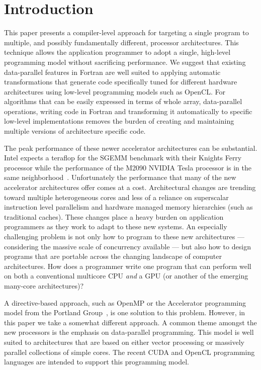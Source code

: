 \section{Introduction}
\label{sec:intro}

This paper presents a compiler-level approach for targeting a single program to
multiple, and possibly fundamentally different, processor architectures.  This
technique allows the application programmer to adopt a single, high-level
programming model without sacrificing performance.  We suggest that existing
data-parallel features in Fortran are well suited to applying automatic
transformations that generate code specifically tuned for different hardware
architectures using low-level programming models such as OpenCL.  For algorithms
that can be easily expressed in terms of whole array, data-parallel operations,
writing code in Fortran and transforming it automatically to specific low-level
implementations removes the burden of creating and maintaining multiple versions
of architecture specific code.

The peak performance of these newer accelerator architectures can be substantial.
Intel expects a teraflop for the SGEMM benchmark with their Knights Ferry
processor while the performance of the M2090 NVIDIA Tesla processor is in the
same neighborhood~\cite{hpcwire11manycore}.  Unfortunately the performance that
many of the new accelerator architectures offer comes at a cost.  Architectural
changes are trending toward multiple heterogeneous cores and less of a reliance
on superscalar instruction level parallelism and hardware managed memory
hierarchies (such as traditional caches).  These changes place a heavy burden on
application programmers as they work to adapt to these new systems.  An
especially challenging problem is not only how to program to these new
architectures --- considering the massive scale of concurrency available --- but
also how to design programs that are portable across the changing landscape of
computer architectures.  How does a programmer write one program that can
perform well on both a conventional multicore CPU \emph{and} a GPU (or another
of the emerging many-core architectures)?

A directive-based approach, such as OpenMP or the Accelerator programming model
from the Portland Group~\cite{pgi10accelerator}, is one solution to this
problem.  However, in this paper we take a somewhat different approach.  A
common theme amongst the new processors is the emphasis on data-parallel
programming.  This model is well suited to architectures that are
based on either vector processing or massively parallel collections of simple
cores.  The recent CUDA and OpenCL programming languages are intended to
support this programming model.

